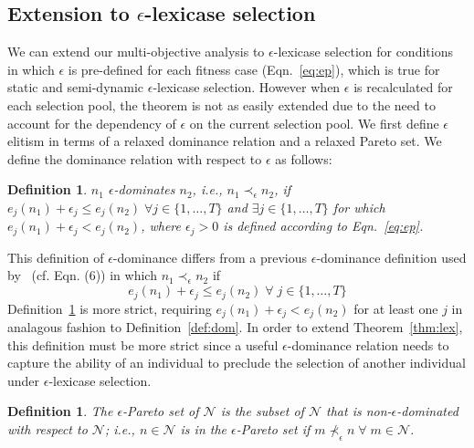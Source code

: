 \documentclass[twoside]{article}
\newtheorem{defn}[lex]{Definition}
\begin{document}
\subsection{Extension to $\epsilon$-lexicase selection}
We can extend our multi-objective analysis to $\epsilon$-lexicase selection for conditions in which $\epsilon$ is pre-defined for each fitness case  (Eqn.~\ref{eq:ep}), which is true for static and semi-dynamic $\epsilon$-lexicase selection. However when $\epsilon$ is recalculated for each selection pool, the theorem is not as easily extended due to the need to account for the dependency of $\epsilon$ on the current selection pool. We first define $\epsilon$ elitism in terms of a relaxed dominance relation and a relaxed Pareto set. We define the dominance relation with respect to $\epsilon$ as follows:


\begin{defn}\label{def:edom}
$n_1$ {\it $\epsilon$-dominates} $n_2$, i.e., ${n_1} \prec_{\epsilon} {n_2}$, if $e_j(n_1) + \epsilon_j \leq e_j(n_2)  \;
\forall j  \in \{1,\dots,T\}$ and $\exists j \in \{1,\dots,T\}$ for which $e_j(n_1) + \epsilon_j < e_j(n_2) $, where $\epsilon_j>0$ is defined according to Eqn.~\ref{eq:ep}.
\end{defn}


This definition of $\epsilon$-dominance differs from a previous $\epsilon$-dominance definition used by~\cite{laumanns_archiving_2002} (cf. Eqn. (6)) in which ${n_1} \prec_{\epsilon} {n_2}$ if \[ e_j(n_1) + \epsilon_j \leq e_j(n_2) \; \forall \; j  \in \{1,\dots,T\}\] 
Definition~\ref{def:edom} is more strict, requiring $e_j(n_1) + \epsilon_j < e_j(n_2)$ for at least one $j$ in analagous fashion to Definition~\ref{def:dom}.  In order to extend Theorem~\ref{thm:lex}, this definition must be more strict since a useful $\epsilon$-dominance relation needs to capture the ability of an individual to preclude the selection of another individual under $\epsilon$-lexicase selection. 
 
\begin{defn}\label{def:epset}
The {\it $\epsilon$-Pareto set} of $\mathcal{N}$ is the subset of $\mathcal{N}$ that is non-$\epsilon$-dominated with respect to $\mathcal{N}$; i.e., $n \in \mathcal{N}$ is in the $\epsilon$-Pareto set if $m \nprec_{\epsilon} n \; \forall \; m \in \mathcal{N}$. 
\end{defn}
\end{document}
